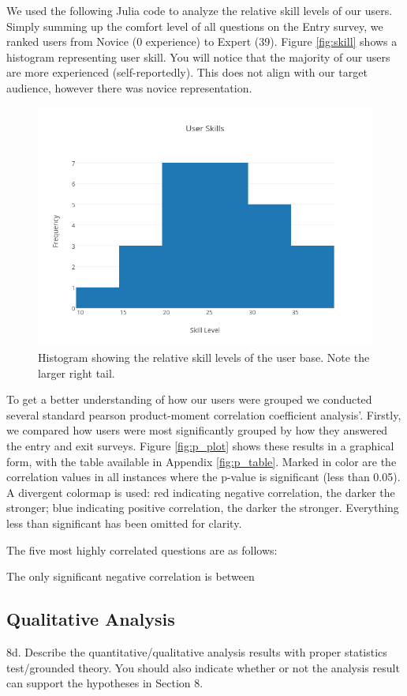 We used the following Julia code to analyze the relative skill levels of our
users. Simply summing up the comfort level of all questions on the Entry survey,
we ranked users from Novice (0 experience) to Expert (39). Figure
\ref{fig:skill} shows a histogram representing user skill. You will notice that
the majority of our users are more experienced (self-reportedly). This does not
align with our target audience, however there was novice representation.
\begin{figure}[ht]
  \centering
  \includegraphics[width=0.8\linewidth]{figures/stats/user-skills.png}
  \caption{\label{fig:Skill} Histogram showing the relative skill levels of the
    user base. Note the larger right tail. }
\end{figure}

To get a better understanding of how our users were grouped we conducted several
standard pearson product-moment correlation coefficient analysis'. Firstly, we
compared how users were most significantly grouped by how they answered the
entry and exit surveys. Figure \ref{fig:p_plot} shows these results in a
graphical form, with the table available in Appendix \ref{fig:p_table}. Marked
in color are the correlation values in all instances where the p-value is
significant (less than 0.05). A divergent colormap is used: red indicating
negative correlation, the darker the stronger; blue indicating positive
correlation, the darker the stronger. Everything less than significant has been
omitted for clarity.

The five most highly correlated questions are as follows:

The only significant negative correlation is between

\subsection{Qualitative Analysis}
    8d. Describe the quantitative/qualitative analysis results with proper
    statistics test/grounded theory. You should also indicate whether or not the
    analysis result can support the hypotheses in Section 8.

